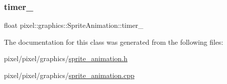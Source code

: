 \subsubsection{\texorpdfstring{timer\+\_\+}{timer\_}}
{\footnotesize\ttfamily float pixel\+::graphics\+::\+Sprite\+Animation\+::timer\+\_\+\hspace{0.3cm}{\ttfamily [private]}}



The documentation for this class was generated from the following files\+:\begin{DoxyCompactItemize}
\item 
pixel/pixel/graphics/\hyperlink{sprite__animation_8h}{sprite\+\_\+animation.\+h}\item 
pixel/pixel/graphics/\hyperlink{sprite__animation_8cpp}{sprite\+\_\+animation.\+cpp}\end{DoxyCompactItemize}
